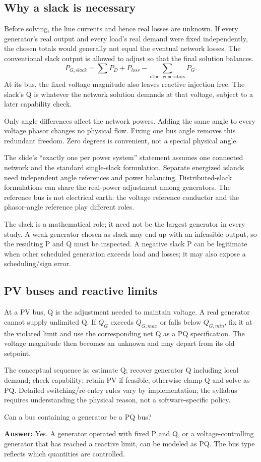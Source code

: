 \documentclass[11pt,a4paper]{article}
\newenvironment{Caution}[1]{\begin{tcolorbox}[colback=warm,colframe=rust,coltitle=white,title={#1}]}{\end{tcolorbox}}
\newcommand{\checkq}[2]{\begin{tcolorbox}[breakable=false,colback=pale,colframe=teal,coltitle=white,title={Check your understanding}]#1\par\textbf{Answer:} #2\end{tcolorbox}}
\begin{document}
\subsection{Why a slack is necessary}
Before solving, the line currents and hence real losses are unknown. If every generator's real output and every load's real demand were fixed independently, the chosen totals would generally not equal the eventual network losses. The conventional slack output is allowed to adjust so that the final solution balances.
\[
P_{G,slack}=\sum P_D+P_{loss}-\sum_{\text{other generators}}P_G.
\]
At its bus, the fixed voltage magnitude also leaves reactive injection free. The slack's Q is whatever the network solution demands at that voltage, subject to a later capability check.

Only angle differences affect the network powers. Adding the same angle to every voltage phasor changes no physical flow. Fixing one bus angle removes this redundant freedom. Zero degrees is convenient, not a special physical angle.
\begin{Caution}{One slack per connected island in the conventional formulation}
The slide's ``exactly one per power system'' statement assumes one connected network and the standard single-slack formulation. Separate energized islands need independent angle references and power balancing. Distributed-slack formulations can share the real-power adjustment among generators. The reference bus is not electrical earth: the voltage reference conductor and the phasor-angle reference play different roles.
\end{Caution}
The slack is a mathematical role; it need not be the largest generator in every study. A weak generator chosen as slack may end up with an infeasible output, so the resulting P and Q must be inspected. A negative slack P can be legitimate when other scheduled generation exceeds load and losses; it may also expose a scheduling/sign error.
\subsection{PV buses and reactive limits}
At a PV bus, Q is the adjustment needed to maintain voltage. A real generator cannot supply unlimited Q. If $Q_G$ exceeds $Q_{G,max}$ or falls below $Q_{G,min}$, fix it at the violated limit and use the corresponding net Q as a PQ specification. The voltage magnitude then becomes an unknown and may depart from its old setpoint.

The conceptual sequence is: estimate Q; recover generator Q including local demand; check capability; retain PV if feasible; otherwise clamp Q and solve as PQ. Detailed switching/re-entry rules vary by implementation; the syllabus requires understanding the physical reason, not a software-specific policy.
\checkq{Can a bus containing a generator be a PQ bus?}{Yes. A generator operated with fixed P and Q, or a voltage-controlling generator that has reached a reactive limit, can be modeled as PQ. The bus type reflects which quantities are controlled.}
\end{document}
